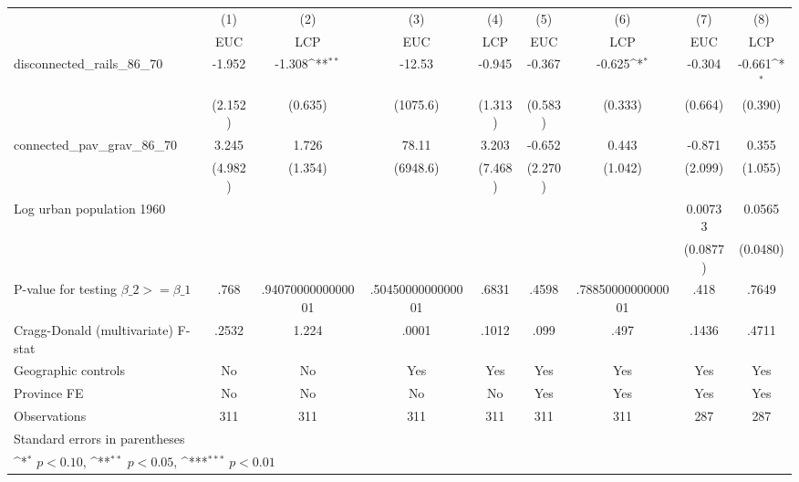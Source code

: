 {
\def\sym#1{\ifmmode^{#1}\else\(^{#1}\)\fi}
\begin{tabular}{l*{8}{c}}
\hline\hline
                &\multicolumn{1}{c}{(1)}&\multicolumn{1}{c}{(2)}&\multicolumn{1}{c}{(3)}&\multicolumn{1}{c}{(4)}&\multicolumn{1}{c}{(5)}&\multicolumn{1}{c}{(6)}&\multicolumn{1}{c}{(7)}&\multicolumn{1}{c}{(8)}\\
                &\multicolumn{1}{c}{EUC}&\multicolumn{1}{c}{LCP}&\multicolumn{1}{c}{EUC}&\multicolumn{1}{c}{LCP}&\multicolumn{1}{c}{EUC}&\multicolumn{1}{c}{LCP}&\multicolumn{1}{c}{EUC}&\multicolumn{1}{c}{LCP}\\
\hline
disconnected\_rails\_86\_70&   -1.952         &   -1.308\sym{**} &   -12.53         &   -0.945         &   -0.367         &   -0.625\sym{*}  &   -0.304         &   -0.661\sym{*}  \\
                &  (2.152)         &  (0.635)         & (1075.6)         &  (1.313)         &  (0.583)         &  (0.333)         &  (0.664)         &  (0.390)         \\
[1em]
connected\_pav\_grav\_86\_70&    3.245         &    1.726         &    78.11         &    3.203         &   -0.652         &    0.443         &   -0.871         &    0.355         \\
                &  (4.982)         &  (1.354)         & (6948.6)         &  (7.468)         &  (2.270)         &  (1.042)         &  (2.099)         &  (1.055)         \\
[1em]
Log urban population 1960&                  &                  &                  &                  &                  &                  &  0.00733         &   0.0565         \\
                &                  &                  &                  &                  &                  &                  & (0.0877)         & (0.0480)         \\
\hline
P-value for testing $\beta\_{2} >= \beta\_{1}$&     .768         &.9407000000000001         &.5045000000000001         &    .6831         &    .4598         &.7885000000000001         &     .418         &    .7649         \\
Cragg-Donald (multivariate) F-stat&    .2532         &    1.224         &    .0001         &    .1012         &     .099         &     .497         &    .1436         &    .4711         \\
Geographic controls&       No         &       No         &      Yes         &      Yes         &      Yes         &      Yes         &      Yes         &      Yes         \\
Province FE     &       No         &       No         &       No         &       No         &      Yes         &      Yes         &      Yes         &      Yes         \\
Observations    &      311         &      311         &      311         &      311         &      311         &      311         &      287         &      287         \\
\hline\hline
\multicolumn{9}{l}{\footnotesize Standard errors in parentheses}\\
\multicolumn{9}{l}{\footnotesize \sym{*} \(p<0.10\), \sym{**} \(p<0.05\), \sym{***} \(p<0.01\)}\\
\end{tabular}
}
